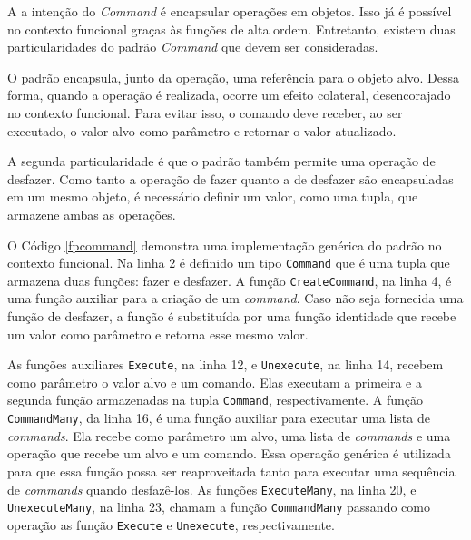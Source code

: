 A a intenção do \textit{Command} é encapsular operações 
em objetos. Isso já é possível no contexto 
funcional graças às funções de alta ordem. 
Entretanto, existem duas particularidades 
do padrão \textit{Command} que devem ser consideradas. 

O padrão encapsula, junto da operação, uma 
referência para o objeto alvo. Dessa forma, 
quando a operação é realizada, ocorre 
um efeito colateral, desencorajado 
no contexto funcional. Para evitar isso, o 
comando deve receber, ao ser executado, o 
valor alvo como parâmetro e retornar o 
valor atualizado.

A segunda particularidade é que o padrão 
também permite uma operação de desfazer. Como 
tanto a operação de fazer quanto a de desfazer 
são encapsuladas em um mesmo objeto, é necessário 
definir um valor, como uma tupla, que armazene ambas 
as operações.

O Código \ref{fpcommand} demonstra uma implementação 
genérica do padrão no contexto funcional. Na linha 2 
é definido um tipo \texttt{Command} que é uma tupla que 
armazena duas funções: fazer e desfazer. A função 
\texttt{CreateCommand}, na linha 4, é uma função auxiliar para 
a criação de um \textit{command}. Caso não seja fornecida 
uma função de desfazer, a função é substituída por 
uma função identidade que recebe um valor como 
parâmetro e retorna esse mesmo valor.

As funções auxiliares \texttt{Execute}, na linha 12, e 
\texttt{Unexecute}, na linha 14, recebem como parâmetro o valor 
alvo e um comando. Elas executam a primeira e a 
segunda função armazenadas na tupla \texttt{Command}, 
respectivamente. A função \texttt{CommandMany}, da linha 16, 
é uma função auxiliar 
para executar uma lista de \textit{commands}. Ela recebe 
como parâmetro um alvo, uma lista de \textit{commands} e 
uma operação que recebe um alvo e um comando. Essa 
operação genérica é utilizada para que essa função 
possa ser reaproveitada tanto para executar uma 
sequência de \textit{commands} quando desfazê-los. 
As funções \texttt{ExecuteMany}, na linha 20, e \texttt{UnexecuteMany}, 
na linha 23, chamam a função \texttt{CommandMany} passando 
como operação as função \texttt{Execute} e \texttt{Unexecute}, 
respectivamente.


